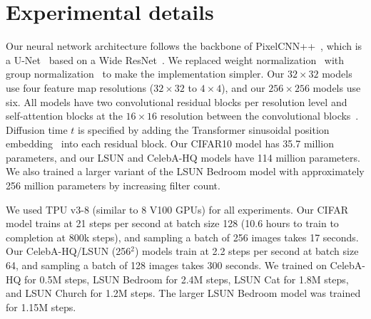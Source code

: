\documentclass{article}
\begin{document}
\section{Experimental details}
\label{sec:experiment_details}

Our neural network architecture follows the backbone of PixelCNN++~\citep{salimans2017pixelcnn++}, which is a U-Net~\citep{ronneberger2015unet} based on a Wide ResNet~\citep{zagoruyko2016wide}. We replaced weight normalization~\citep{salimans2016weight} with group normalization~\citep{wu2018group} to make the implementation simpler. Our $32 \times 32$ models use four feature map resolutions ($32 \times 32$ to $4 \times 4$), and our $256 \times 256$ models use six. All models have two convolutional residual blocks per resolution level and self-attention blocks at the $16 \times 16$ resolution between the convolutional blocks~\citep{chen2018pixelsnail}. Diffusion time $t$ is specified by adding the Transformer sinusoidal position embedding~\citep{vaswani2017attention} into each residual block. Our CIFAR10 model has 35.7 million parameters, and our LSUN and CelebA-HQ models have 114 million parameters. We also trained a larger variant of the LSUN Bedroom model with approximately 256 million parameters by increasing filter count.

We used TPU v3-8 (similar to 8 V100 GPUs) for all experiments. Our CIFAR model trains at 21 steps per second at batch size 128 (10.6 hours to train to completion at 800k steps), and sampling a batch of 256 images takes 17 seconds.
Our CelebA-HQ/LSUN (256$^2$) models train at 2.2 steps per second at batch size 64, and sampling a batch of 128 images takes 300 seconds. We trained on CelebA-HQ for 0.5M steps, LSUN Bedroom for 2.4M steps, LSUN Cat for 1.8M steps, and LSUN Church for 1.2M steps. The larger LSUN Bedroom model was trained for 1.15M steps.
\end{document}
